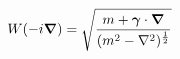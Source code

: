 \begin{equation}
W(-i \mbox{\boldmath $\nabla$} ) = \sqrt{\frac{m+\mbox{\boldmath $\gamma$} \cdot \mbox{\boldmath $\nabla$}}{(m^{2} - 
\nabla^{2})^{\frac{1}{2}}}} 
\end{equation}

